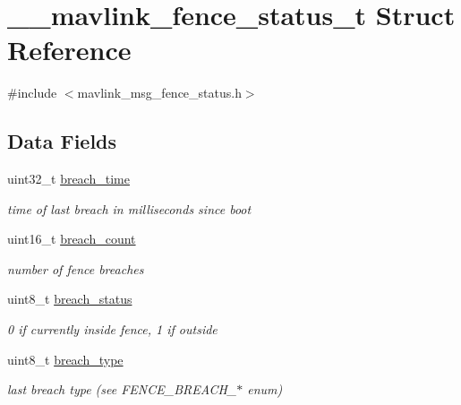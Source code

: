 \hypertarget{struct____mavlink__fence__status__t}{\section{\+\_\+\+\_\+mavlink\+\_\+fence\+\_\+status\+\_\+t Struct Reference}
\label{struct____mavlink__fence__status__t}
}


{\ttfamily \#include $<$mavlink\+\_\+msg\+\_\+fence\+\_\+status.\+h$>$}

\subsection*{Data Fields}
\begin{DoxyCompactItemize}
\item 
uint32\+\_\+t \hyperlink{struct____mavlink__fence__status__t_a9ecb570b993e2c9525ff6f6dfd967916}{breach\+\_\+time}
\begin{DoxyCompactList}\small\item\em time of last breach in milliseconds since boot \end{DoxyCompactList}\item 
uint16\+\_\+t \hyperlink{struct____mavlink__fence__status__t_a4a5592dc473ed8cc03668e7fc851ced1}{breach\+\_\+count}
\begin{DoxyCompactList}\small\item\em number of fence breaches \end{DoxyCompactList}\item 
uint8\+\_\+t \hyperlink{struct____mavlink__fence__status__t_ac4c4d72b7f8364bee6c54721a3f5bcf5}{breach\+\_\+status}
\begin{DoxyCompactList}\small\item\em 0 if currently inside fence, 1 if outside \end{DoxyCompactList}\item 
uint8\+\_\+t \hyperlink{struct____mavlink__fence__status__t_a638d845cdd228e40ef32d988f6235667}{breach\+\_\+type}
\begin{DoxyCompactList}\small\item\em last breach type (see F\+E\+N\+C\+E\+\_\+\+B\+R\+E\+A\+C\+H\+\_\+$\ast$ enum) \end{DoxyCompactList}\end{DoxyCompactItemize}


